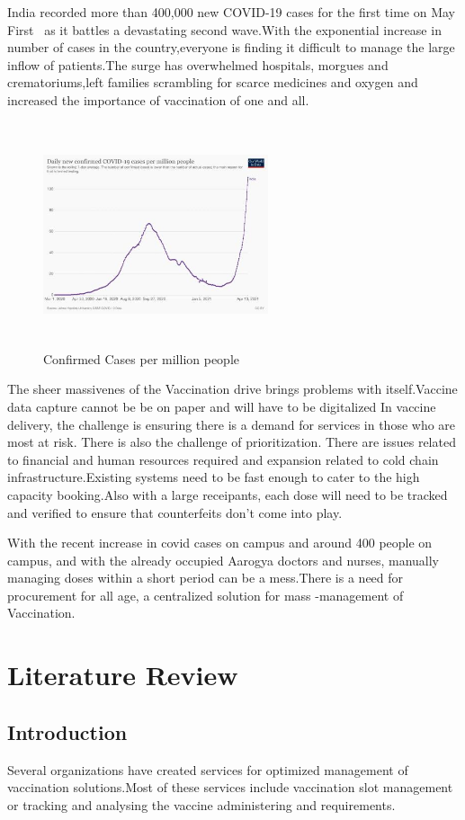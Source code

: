 \documentclass[10pt,twocolumn,letterpaper]{article}
\begin{document}
India recorded more than 400,000 new COVID-19 cases for the first time on May First~\cite{Cases1} as it battles a devastating second wave.With the exponential increase in number of cases in the country,everyone is finding it difficult to manage the large inflow of patients.The surge has overwhelmed hospitals, morgues and crematoriums,left families scrambling for scarce medicines and oxygen and increased the importance of vaccination of one and all.
\begin{figure}[h]
    \centering
    \includegraphics[width=2.6in, height=2.6in]{1.jpeg}
    \caption{Confirmed Cases per million people ~\cite{Photo}}
\end{figure}
The sheer massivenes of the Vaccination drive brings problems with itself.Vaccine data capture cannot be be on paper and will have to be digitalized In vaccine delivery, the challenge is ensuring there is a demand for services in those who are most at risk. There is also the challenge of prioritization. There are issues related to financial and human resources required and expansion related to cold chain infrastructure.Existing systems need to be fast enough to cater to the high capacity booking.Also with a large receipants, each dose will need to be tracked and verified to ensure that counterfeits don't come into play.

With the recent increase in covid cases on campus and around 400 people on campus, and with the already occupied Aarogya doctors and nurses,
manually managing doses within a short period can be a mess.There is a need for procurement for all age, a centralized solution for mass -management of Vaccination.
\section{Literature Review}
\subsection{Introduction}
Several organizations have created services for optimized management of vaccination solutions.Most of these services include vaccination slot management or tracking and analysing the vaccine administering and requirements.
\end{document}
